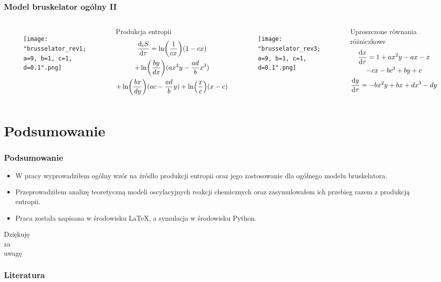 \documentclass{beamer}
\begin{document}
\begin{frame}
\frametitle{Model bruskelator ogólny II}
\begin{columns}
\begin{figure}
\texttt{[image: "brusselator\_rev1; a=9, b=1, c=1, d=0.1".png]}
\end{figure}
\begin{block}{Produkcja entropii}
\vspace*{-\baselineskip}\setlength\belowdisplayshortskip{0pt}
\footnotesize
\begin{gather*}
	\dv{_{i}S}{\tau} = \ln(\frac{1}{cx})(1 - cx) \\
	+ \ln(\frac{by}{dx})(ax^{2}y - \frac{ad}{b}x^{3}) \\
	+ \ln(\frac{bx}{dy})(ac - \frac{ad}{b}y) + \ln(\frac{x}{c})(x - c)
\end{gather*}
\normalsize
\end{block}
\begin{figure}
\texttt{[image: "brusselator\_rev3; a=9, b=1, c=1, d=0.1".png]}
\end{figure}
\begin{block}{Uproszczone równania różniczkowe}
\vspace*{-\baselineskip}\setlength\belowdisplayshortskip{0pt}
\small
\begin{gather*}
	\dv{x}{\tau} = 1 + ax^{2}y - ax - x \\
	- cx - bc^{3} + by + c \\
	\dv{y}{\tau} = -bx^{2}y + bx + dx^{3} - dy
\end{gather*}
\normalsize
\end{block}
\end{columns}
\end{frame}

\section{Podsumowanie}

\begin{frame}
\frametitle{Podsumowanie}
\begin{itemize}
\item W pracy wyprowadziłem ogólny wzór na źródło produkcji entropii oraz jego zastosowanie dla ogólnego modelu bruskelatora. 
\item Przeprowadziłem analizę teoretyczną modeli oscylacyjnych reakcji chemicznych oraz zasymulowałem ich przebieg razem z produkcją entropii. 
\item Praca została napisana w środowisku \LaTeX, a symulacja w środowisku Python.
\end{itemize}
\end{frame}

\begin{frame}
\begin{center}
\Large
Dziękuję \\
za \\
uwagę
\end{center}
\end{frame}



\begin{frame}
\frametitle{Literatura}
\nocite{orlik, pigon1, kawczynski, palczewski, fortuna, orlik_sily_w_przyrodzie}
\tiny
\printbibliography
\end{frame}
\end{document}

